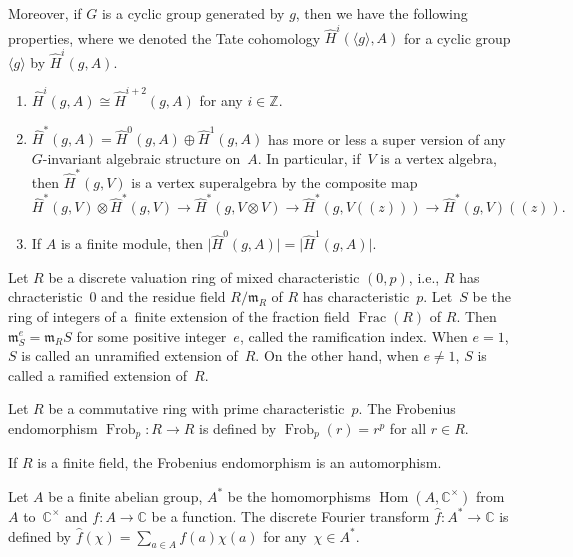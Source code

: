\documentclass[11pt]{article}
\numberwithin{equation}{section}
\numberwithin{equation}{section}
\begin{document}
Moreover, if $G$ is a cyclic group generated by $g$, then we have the following properties, where we denoted the Tate cohomology $\hat{H}^i(\langle g\rangle,A)$ for a cyclic group $\langle g\rangle$ by $\hat{H}^i(g,A)$.
\begin{enumerate}\itemsep=0pt
\item[(3)] ${\hat{H}}^i(g,A)\cong{\hat{H}}^{i+2}(g,A)$ for any $i\in\mathbb{Z}$.
\item[(4)]\label{Tsuper} ${\hat{H}}^\ast (g,A )=\hat{H}^0(g,A)\oplus\hat{H}^1(g,A)$ has more or less a super version of any $G$-invariant algebraic structure on~$A$. In particular, if~$V$ is a vertex algebra, then $\hat{H}^*(g,V)$ is a vertex superalgebra by the composite map
\[
\hat{H}^*(g,V)\otimes \hat{H}^*(g,V)\rightarrow \hat{H}^*(g,V\otimes V)\rightarrow \hat{H}^*(g,V((z)))\rightarrow \hat{H}^*(g,V)((z)).
\]
\item[(5)] If $A$ is a finite module, then $\big|{\hat{H}}^0(g,A)\big|=\big|{\hat{H}}^1(g,A)\big|$.
\end{enumerate}

\setcounter{Theorem}{9}
\begin{Definition}
Let $R$ be a discrete valuation ring of mixed characteristic $(0,p)$, i.e., $R$ has chracteristic~0 and the residue field $R/\mathfrak{m}_R$ of $R$ has characteristic~$p$. Let~$S$ be the ring of integers of a~finite extension of the fraction field $\operatorname{Frac}(R)$ of $R$. Then $\mathfrak{m}^e_S=\mathfrak{m}_RS$ for some positive integer~$e$, called the ramification index. When $e=1$, $S$ is called an unramified extension of~$R$. On the other hand, when $e\neq 1$, $S$ is called a ramified extension of~$R$.
\end{Definition}

\begin{Definition}
Let $R$ be a commutative ring with prime characteristic~$p$. The Frobenius endomorphism $\operatorname{Frob}_p\colon R\rightarrow R$ is defined by $\operatorname{Frob}_p(r)=r^p$ for all $r\in R$.
\end{Definition}

If $R$ is a finite field, the Frobenius endomorphism is an automorphism.

\begin{Definition}
Let $A$ be a finite abelian group, $A^*$ be the homomorphisms $\operatorname{Hom}(A,\mathbb{C}^\times)$ from~$A$ to~$\mathbb{C}^\times$ and $f\colon A \rightarrow \mathbb{C}$ be a function. The discrete Fourier transform $\hat{f}\colon A^*\rightarrow \mathbb{C}$ is defined by $\hat{f}(\chi)=\sum_{a \in A}f(a)\chi (a)$ for any~$\chi \in A^*$.
\end{Definition}
\end{document}
